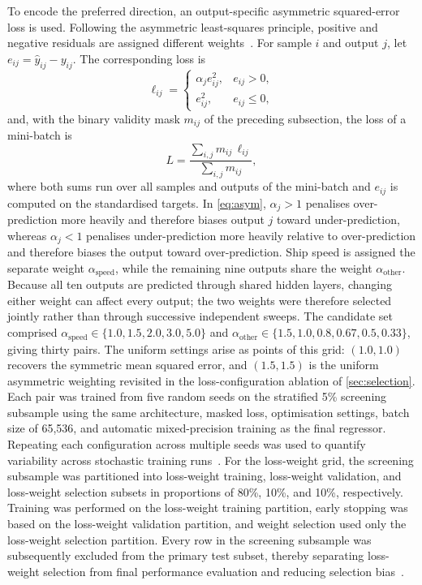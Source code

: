 \documentclass[final,5p,times,twocolumn,numbers]{elsarticle}
\begin{document}
To encode the preferred direction, an output-specific asymmetric squared-error loss is used. Following the asymmetric least-squares principle, positive and negative residuals are assigned different weights~\cite{newey1987}. For sample $i$ and output $j$, let $e_{ij}=\hat{y}_{ij}-y_{ij}$. The corresponding loss is
\begin{equation}
\ell_{ij}=
\begin{cases}
\alpha_j e_{ij}^{2}, & e_{ij}>0,\\
e_{ij}^{2}, & e_{ij}\leq0,
\end{cases}
\label{eq:asym}
\end{equation}
and, with the binary validity mask $m_{ij}$ of the preceding subsection, the loss of a mini-batch is
\begin{equation}
L=\frac{\sum_{i,j} m_{ij}\,\ell_{ij}}{\sum_{i,j} m_{ij}},
\label{eq:masked}
\end{equation}
where both sums run over all samples and outputs of the mini-batch and $e_{ij}$ is computed on the standardised targets. In \autoref{eq:asym}, $\alpha_j>1$ penalises over-prediction more heavily and therefore biases output $j$ toward under-prediction, whereas $\alpha_j<1$ penalises under-prediction more heavily relative to over-prediction and therefore biases the output toward over-prediction. Ship speed is assigned the separate weight $\alpha_{\mathrm{speed}}$, while the remaining nine outputs share the weight $\alpha_{\mathrm{other}}$. Because all ten outputs are predicted through shared hidden layers, changing either weight can affect every output; the two weights were therefore selected jointly rather than through successive independent sweeps. The candidate set comprised $\alpha_{\mathrm{speed}}\in\{1.0,1.5,2.0,3.0,5.0\}$ and $\alpha_{\mathrm{other}}\in\{1.5,1.0,0.8,0.67,0.5,0.33\}$, giving thirty pairs. The uniform settings arise as points of this grid: $(1.0,1.0)$ recovers the symmetric mean squared error, and $(1.5,1.5)$ is the uniform asymmetric weighting revisited in the loss-configuration ablation of \autoref{sec:selection}. Each pair was trained from five random seeds on the stratified 5\% screening subsample using the same architecture, masked loss, optimisation settings, batch size of 65{,}536, and automatic mixed-precision training as the final regressor. Repeating each configuration across multiple seeds was used to quantify variability across stochastic training runs~\cite{bouthillier2021variance}. For the loss-weight grid, the screening subsample was partitioned into loss-weight training, loss-weight validation, and loss-weight selection subsets in proportions of 80\%, 10\%, and 10\%, respectively. Training was performed on the loss-weight training partition, early stopping was based on the loss-weight validation partition, and weight selection used only the loss-weight selection partition. Every row in the screening subsample was subsequently excluded from the primary test subset, thereby separating loss-weight selection from final performance evaluation and reducing selection bias~\cite{cawley2010selection}.
\end{document}
